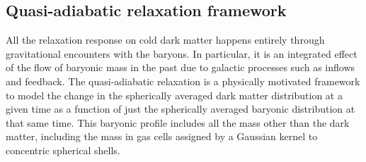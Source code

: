 \subsection{Quasi-adiabatic relaxation framework}
\label{sec:methods-adiab}
All the relaxation response on cold dark matter happens entirely through gravitational encounters with the baryons. In particular, it is an integrated effect of the flow of baryonic mass in the past due to galactic processes such as inflows and feedback. The quasi-adiabatic relaxation is a physically motivated framework to model the change in the spherically averaged dark matter distribution at a given time as a function of just the spherically averaged baryonic distribution at that same time. This baryonic profile includes all the mass other than the dark matter, including the mass in gas cells assigned by a Gaussian kernel to concentric spherical shells. 


